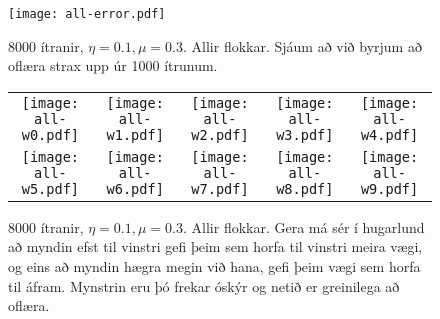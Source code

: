 \documentclass[a4paper,icelandic]{article}
\begin{document}
\begin{figure}[h!]
  \begin{center}
    \texttt{[image: all-error.pdf]}
  \end{center}
  \caption{8000 ítranir, $\eta=0.1,\mu=0.3$. Allir flokkar. Sjáum að við
  byrjum að oflæra strax upp úr 1000 ítrunum.}
  \label{fig:all-error}
\end{figure}
\begin{figure}[h!]
  \begin{center}
    \begin{tabular}{ccccc}
      \texttt{[image: all-w0.pdf]}
      & \texttt{[image: all-w1.pdf]}
      & \texttt{[image: all-w2.pdf]}
      & \texttt{[image: all-w3.pdf]}
      & \texttt{[image: all-w4.pdf]}
      \\
      \texttt{[image: all-w5.pdf]}
      & \texttt{[image: all-w6.pdf]}
      & \texttt{[image: all-w7.pdf]}
      & \texttt{[image: all-w8.pdf]}
      & \texttt{[image: all-w9.pdf]}
    \end{tabular}
  \end{center}
  \caption{8000 ítranir, $\eta=0.1,\mu=0.3$. Allir flokkar. Gera má sér í
  hugarlund að myndin efst til vinstri gefi þeim sem horfa til vinstri
  meira vægi, og eins að myndin hægra megin við hana, gefi þeim vægi sem horfa
  til áfram. Mynstrin eru þó frekar óskýr og netið er greinilega að
  oflæra.}

  \label{fig:all-weights}
\end{figure}
\end{document}
